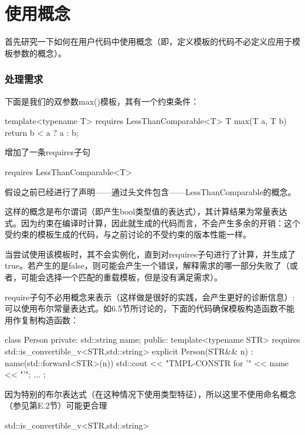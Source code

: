 \section{使用概念}

首先研究一下如何在用户代码中使用概念（即，定义模板的代码不必定义应用于模板参数的概念）。

\subsubsection{处理需求}

下面是我们的双参数max()模板，其有一个约束条件：

\begin{cpp}
template<typename T> requires LessThanComparable<T>
T max(T a, T b) {
	return b < a ? a : b;
}
\end{cpp}

增加了一条requires子句

\begin{cpp}
requires LessThanComparable<T>
\end{cpp}

假设之前已经进行了声明——通过头文件包含——LessThanComparable的概念。

这样的概念是布尔谓词（即产生bool类型值的表达式），其计算结果为常量表达式。因为约束在编译时计算，因此就生成的代码而言，不会产生多余的开销：这个受约束的模板生成的代码，与之前讨论的不受约束的版本性能一样。

当尝试使用该模板时，其不会实例化，直到对requires子句进行了计算，并生成了true。若产生的是false，则可能会产生一个错误，解释需求的哪一部分失败了（或者，可能会选择一个匹配的重载模板，但是没有满足需求）。

require子句不必用概念来表示（这样做是很好的实践，会产生更好的诊断信息）:可以使用布尔常量表达式。如6.5节所讨论的，下面的代码确保模板构造函数不能用作复制构造函数：

\begin{cpp}
class Person
{
	private:
	std::string name;
	public:
	template<typename STR>
	requires std::is_convertible_v<STR,std::string>
	explicit Person(STR&& n)
	: name(std::forward<STR>(n)) {
		std::cout << "TMPL-CONSTR for '" << name << "'\n";
	}
	...
};
\end{cpp}

因为特别的布尔表达式（在这种情况下使用类型特征），所以这里不使用命名概念（参见第E.2节）可能更合理

\begin{cpp}
std::is_convertible_v<STR,std::string>
\end{cpp}

